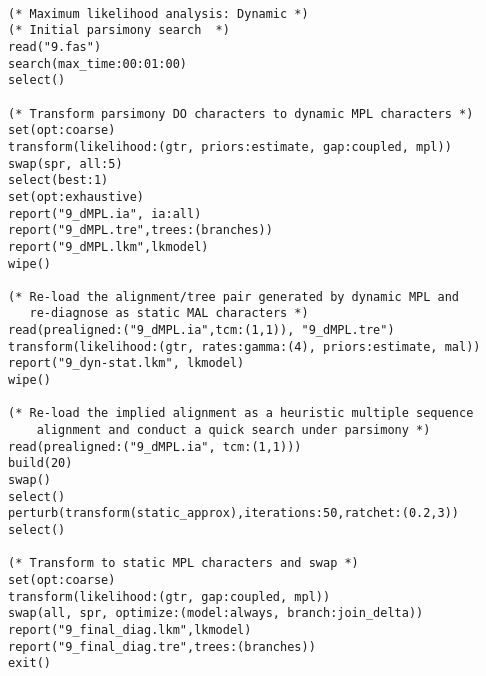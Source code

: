\begin{verbatim}

(* Maximum likelihood analysis: Dynamic *)
(* Initial parsimony search  *)
read("9.fas")
search(max_time:00:01:00)
select()

(* Transform parsimony DO characters to dynamic MPL characters *)
set(opt:coarse)
transform(likelihood:(gtr, priors:estimate, gap:coupled, mpl))
swap(spr, all:5)
select(best:1)
set(opt:exhaustive)
report("9_dMPL.ia", ia:all)
report("9_dMPL.tre",trees:(branches))
report("9_dMPL.lkm",lkmodel)
wipe()

(* Re-load the alignment/tree pair generated by dynamic MPL and
   re-diagnose as static MAL characters *)
read(prealigned:("9_dMPL.ia",tcm:(1,1)), "9_dMPL.tre")
transform(likelihood:(gtr, rates:gamma:(4), priors:estimate, mal))
report("9_dyn-stat.lkm", lkmodel)
wipe()

(* Re-load the implied alignment as a heuristic multiple sequence
    alignment and conduct a quick search under parsimony *)
read(prealigned:("9_dMPL.ia", tcm:(1,1)))
build(20)
swap()
select()
perturb(transform(static_approx),iterations:50,ratchet:(0.2,3))
select()

(* Transform to static MPL characters and swap *)
set(opt:coarse)
transform(likelihood:(gtr, gap:coupled, mpl))
swap(all, spr, optimize:(model:always, branch:join_delta))
report("9_final_diag.lkm",lkmodel)
report("9_final_diag.tre",trees:(branches))
exit()
\end{verbatim}

